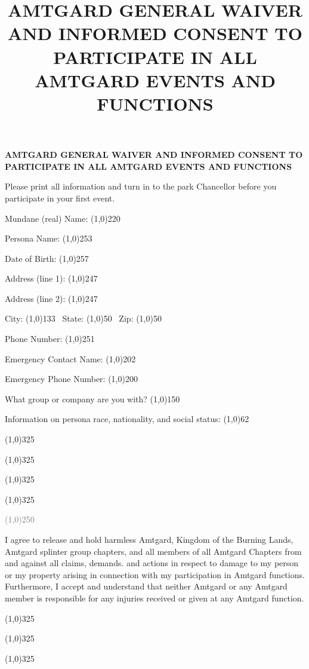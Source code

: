 \documentclass[nopagenumbers]{article}
\title{AMTGARD GENERAL WAIVER AND INFORMED CONSENT TO
PARTICIPATE IN ALL AMTGARD EVENTS AND FUNCTIONS}
\author{}
\begin{document}

\begin{center}
\textbf{{\Large AMTGARD GENERAL WAIVER AND INFORMED CONSENT TO
PARTICIPATE IN ALL AMTGARD EVENTS AND FUNCTIONS}}
\end{center}

Please print all information and turn in to the park Chancellor before you participate in your first event.

\bigskip

Mundane (real) Name: \line(1,0){220}

Persona Name: \line(1,0){253}

Date of Birth: \line(1,0){257}


\medskip

Address (line 1): \line(1,0){247}

Address (line 2): \line(1,0){247}

City: \line(1,0){133}~
State: \line(1,0){50}~
Zip: \line(1,0){50}

Phone Number: \line(1,0){251}

\medskip

Emergency Contact Name: \line(1,0){202}

Emergency Phone Number: \line(1,0){200}

\medskip

What group or company are you with? \line(1,0){150}

Information on persona race, nationality, and social status: \line(1,0){62}

\line(1,0){325}

\line(1,0){325}

\line(1,0){325}

\line(1,0){325}

\bigskip

\begin{center}
\textcolor{Gray}{\line(1,0){250}}
\end{center}

I agree to release and hold harmless Amtgard, Kingdom of the Burning Lands, Amtgard splinter group chapters, and all members of all Amtgard Chapters from and against all claims, demands. and actions in respect to damage to my person or my property arising in connection with my participation in Amtgard functions. Furthermore, I accept and understand that neither Amtgard or any Amtgard member is responsible for any injuries received or given at any Amtgard function.

\bigskip

\line(1,0){325}\\
{\footnotesize {}}

\smallskip

\line(1,0){325}\\
{\footnotesize{}}

\smallskip

\line(1,0){325}\\
{\footnotesize{}}
\end{document}
